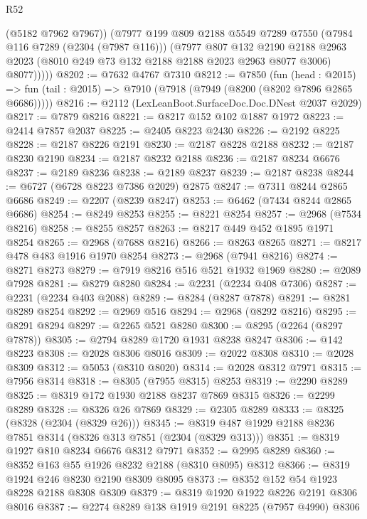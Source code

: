 \begin{lexlean}{R52}
\begin{coremodule}
            (@5182 @7962 @7967))
          (@7977
            @199
            @809
            @2188
            @5549
            @7289
            @7550
            (@7984 @116 @7289 (@2304 (@7987 @116)))
            (@7977
              @807
              @132
              @2190
              @2188
              @2963
              @2023
              (@8010 @249 @73 @132 @2188 @2188 @2023 @2963 @8077 @3006)
              @8077)))))
@8202 := @7632 @4767 @7310
@8212 := @7850
    (fun (head : @2015) =>
    fun (tail : @2015) => @7910 (@7918 (@7949 (@8200 (@8202 @7896 @2865 @6686)))))
@8216 := @2112 (LexLeanBoot.SurfaceDoc.Doc.DNest @2037 @2029)
@8217 := @7879 @8216
@8221 := @8217 @152 @102 @1887 @1972
@8223 := @2414 @7857 @2037
@8225 := @2405 @8223 @2430
@8226 := @2192 @8225
@8228 := @2187 @8226 @2191
@8230 := @2187 @8228 @2188
@8232 := @2187 @8230 @2190
@8234 := @2187 @8232 @2188
@8236 := @2187 @8234 @6676
@8237 := @2189 @8236
@8238 := @2189 @8237
@8239 := @2187 @8238
@8244 := @6727 (@6728 @8223 @7386 @2029) @2875
@8247 := @7311 @8244 @2865 @6686
@8249 := @2207 (@8239 @8247)
@8253 := @6462 (@7434 @8244 @2865 @6686)
@8254 := @8249 @8253
@8255 := @8221 @8254
@8257 := @2968 (@7534 @8216)
@8258 := @8255 @8257
@8263 := @8217 @449 @452 @1895 @1971 @8254
@8265 := @2968 (@7688 @8216)
@8266 := @8263 @8265
@8271 := @8217 @478 @483 @1916 @1970 @8254
@8273 := @2968 (@7941 @8216)
@8274 := @8271 @8273
@8279 := @7919 @8216 @516 @521 @1932 @1969
@8280 := @2089 @7928
@8281 := @8279 @8280
@8284 := @2231 (@2234 @408 @7306)
@8287 := @2231 (@2234 @403 @2088)
@8289 := @8284 (@8287 @7878)
@8291 := @8281 @8289 @8254
@8292 := @2969 @516
@8294 := @2968 (@8292 @8216)
@8295 := @8291 @8294
@8297 := @2265 @521 @8280
@8300 := @8295 (@2264 (@8297 @7878))
@8305 := @2794 @8289 @1720 @1931 @8238 @8247
@8306 := @142 @8223
@8308 := @2028 @8306 @8016
@8309 := @2022 @8308
@8310 := @2028 @8309
@8312 := @5053 (@8310 @8020)
@8314 := @2028 @8312 @7971
@8315 := @7956 @8314
@8318 := @8305 (@7955 @8315) @8253
@8319 := @2290 @8289
@8325 := @8319 @172 @1930 @2188 @8237 @7869 @8315
@8326 := @2299 @8289
@8328 := @8326 @26 @7869
@8329 := @2305 @8289
@8333 := @8325 (@8328 (@2304 (@8329 @26)))
@8345 := @8319 @487 @1929 @2188 @8236 @7851 @8314 (@8326 @313 @7851 (@2304 (@8329 @313)))
@8351 := @8319 @1927 @810 @8234 @6676 @8312 @7971
@8352 := @2995 @8289
@8360 := @8352 @163 @55 @1926 @8232 @2188 (@8310 @8095) @8312
@8366 := @8319 @1924 @246 @8230 @2190 @8309 @8095
@8373 := @8352 @152 @54 @1923 @8228 @2188 @8308 @8309
@8379 := @8319 @1920 @1922 @8226 @2191 @8306 @8016
@8387 := @2274 @8289 @138 @1919 @2191 @8225 (@7957 @4990) @8306

\end{coremodule}
\end{lexlean}
